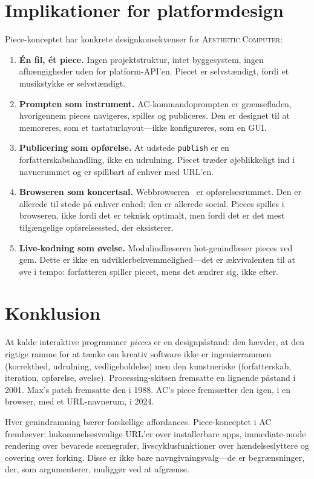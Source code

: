 \documentclass[10pt,letterpaper,twocolumn]{article}
\newcommand{\ac}{\textsc{Aesthetic.Computer}}
\begin{document}
\section{Implikationer for platformdesign}

Piece-konceptet har konkrete designkonsekvenser for \ac{}:

\begin{enumerate}
  \item \textbf{Én fil, ét piece.} Ingen projektstruktur, intet byggesystem, ingen afhængigheder uden for platform-API'en. Piecet er selvstændigt, fordi et musikstykke er selvstændigt.
  \item \textbf{Prompten som instrument.} AC-kommandoprompten er grænsefladen, hvorigennem pieces navigeres, spilles og publiceres. Den er designet til at memoreres, som et tastaturlayout---ikke konfigureres, som en GUI.
  \item \textbf{Publicering som opførelse.} At udstede \texttt{publish} er en forfatterskabshandling, ikke en udrulning. Piecet træder øjeblikkeligt ind i navnerummet og er spillbart af enhver med URL'en.
  \item \textbf{Browseren som koncertsal.} Webbrowseren~\citep{wyse2013viability} er opførelsesrummet. Den er allerede til stede på enhver enhed; den er allerede social. Pieces spilles i browseren, ikke fordi det er teknisk optimalt, men fordi det er det mest tilgængelige opførelsessted, der eksisterer.
  \item \textbf{Live-kodning som øvelse.} Modulindlæseren hot-genindlæser pieces ved gem. Dette er ikke en udviklerbekvemmelighed---det er ækvivalenten til at øve i tempo: forfatteren spiller piecet, mens det ændrer sig, ikke efter.
\end{enumerate}

\section{Konklusion}

At kalde interaktive programmer \emph{pieces} er en designpåstand: den hævder, at den rigtige ramme for at tænke om kreativ software ikke er ingeniørrammen (korrekthed, udrulning, vedligeholdelse) men den kunstneriske (forfatterskab, iteration, opførelse, øvelse). Processing-skitsen fremsatte en lignende påstand i 2001. Max's patch fremsatte den i 1988. AC's piece fremsætter den igen, i en browser, med et URL-navnerum, i 2024.

Hver genindramning bærer forskellige affordances. Piece-konceptet i AC fremhæver: hukommelsesvenlige URL'er over installerbare apps, immediate-mode rendering over bevarede scenegrafer, livscyklusfunktioner over hændelseslyttere og covering over forking. Disse er ikke bare navngivningsvalg---de er begrænsninger, der, som \citet{magnusson2010designing} argumenterer, muliggør ved at afgrænse.
\end{document}
